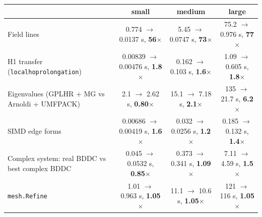 \begin{tabularx}{\textwidth}{@{}>{\raggedright\arraybackslash}X ccc@{}}
\toprule
& \textbf{small} & \textbf{medium} & \textbf{large}\\
\midrule
Field lines & 0.774 $\to$ 0.0137 s, \textbf{56$\times$} & 5.45 $\to$ 0.0747 s, \textbf{73$\times$} & 75.2 $\to$ 0.976 s, \textbf{77$\times$} \\
H1 transfer (\texttt{localhoprolongation}) & 0.00839 $\to$ 0.00476 s, \textbf{1.8$\times$} & 0.162 $\to$ 0.103 s, \textbf{1.6$\times$} & 1.09 $\to$ 0.605 s, \textbf{1.8$\times$} \\
Eigenvalues (GPLHR + MG vs Arnoldi + UMFPACK) & 2.1 $\to$ 2.62 s, \textbf{0.80$\times$} & 15.1 $\to$ 7.18 s, \textbf{2.1$\times$} & 135 $\to$ 21.7 s, \textbf{6.2$\times$} \\
SIMD edge forms & 0.00686 $\to$ 0.00419 s, \textbf{1.6$\times$} & 0.032 $\to$ 0.0256 s, \textbf{1.2$\times$} & 0.185 $\to$ 0.132 s, \textbf{1.4$\times$} \\
Complex system: real BDDC vs best complex BDDC & 0.045 $\to$ 0.0532 s, \textbf{0.85$\times$} & 0.373 $\to$ 0.341 s, \textbf{1.09$\times$} & 7.11 $\to$ 4.59 s, \textbf{1.5$\times$} \\
\texttt{mesh.Refine} & 1.01 $\to$ 0.963 s, \textbf{1.05$\times$} & 11.1 $\to$ 10.6 s, \textbf{1.05$\times$} & 121 $\to$ 116 s, \textbf{1.05$\times$} \\
\bottomrule
\end{tabularx}
